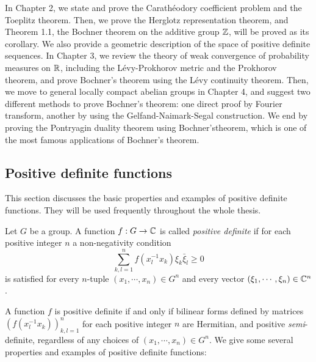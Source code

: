 \documentclass{../../small}
\begin{document}
In Chapter 2, we state and prove the Carath\'eodory coefficient problem and the Toeplitz theorem.
Then, we prove the Herglotz representation theorem, and Theorem 1.1, the Bochner theorem on the additive group $\mathbb{Z}$, will be proved as its corollary.
We also provide a geometric description of the space of positive definite sequences.
In Chapter 3, we review the theory of weak convergence of probability measures on $\mathbb{R}$, including the L\'evy-Prokhorov metric and the Prokhorov theorem, and prove Bochner's theorem using the L\'evy continuity theorem.
Then, we move to general locally compact abelian groups in Chapter 4, and suggest two different methods to prove Bochner's theorem: one direct proof by Fourier transform, another by using the Gelfand-Naimark-Segal construction.
We end by proving the Pontryagin duality theorem using Bochner'stheorem, which is one of the most famous applications of Bochner's theorem.





\subsection{Positive definite functions}
This section discusses the basic properties and examples of positive definite functions.
They will be used frequently throughout the whole thesis.

\begin{defn}
Let $G$ be a group.
A function $f:G\to\mathbb{C}$ is called \emph{positive definite} if for each positive integer $n$ a non-negativity condition
\[\sum_{k,l=1}^nf(x_l^{-1}x_k)\xi_k\bar\xi_l\ge0\]
is satisfied for every $n$-tuple $(x_1,\cdots,x_n)\in G^n$ and every vector $(\xi_1,\cdots,\xi_n)\in\mathbb{C}^n$.
\end{defn}
A function $f$ is positive definite if and only if bilinear forms defined by matrices $(f(x_l^{-1}x_k))_{k,l=1}^n$ for each positive integer $n$ are Hermitian, and positive \emph{semi}-definite, regardless of any choices of $(x_1,\cdots,x_n)\in G^n$.
We give some several properties and examples of positive definite functions:
\end{document}

